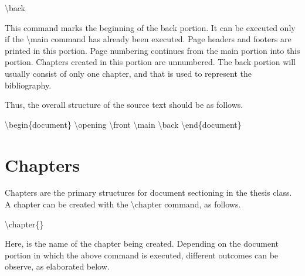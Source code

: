 \documentclass[twoside,openany]{thesis}
\begin{document}
\begin{listing}
\item   {\ttfamily\textbackslash back}

        This command marks the beginning of the back portion.
        It can be executed only if the {\ttfamily\textbackslash main} command has already been executed.
        Page headers and footers are printed in this portion.
        Page numbering continues from the main portion into this portion.
        Chapters created in this portion are unnumbered.
        The back portion will usually consist of only one chapter, and that is used to represent the bibliography.

\end{listing}

Thus, the overall structure of the source text should be as follows.

{\ttfamily
    \textbackslash begin\{document\}\linebreak
    \textbackslash opening\linebreak
        \null{}\linebreak
    \textbackslash front\linebreak
        \null{}\linebreak
    \textbackslash main\linebreak
        \null{}\linebreak
    \textbackslash back\linebreak
        \null{}\linebreak
    \textbackslash end\{document\}
}

\section{Chapters}\label{sec:Chapters}

Chapters are the primary structures for document sectioning in the {\ttfamily thesis} class.
A chapter can be created with the {\ttfamily\textbackslash chapter} command, as follows.

{\ttfamily\textbackslash chapter\{<chapter-name>\}}

Here, {} is the name of the chapter being created.
Depending on the document portion in which the above command is executed, different outcomes can be observe, as elaborated below.
\end{document}
